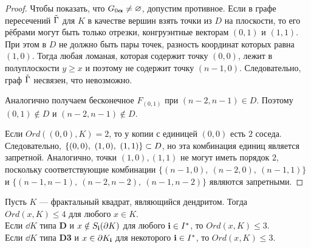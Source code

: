 \begin{proof}
Чтобы показать, что $G_{0{\bm{\alpha}}}\neq\varnothing$, допустим противное.
Если в графе пересечений $\tilde{\Gamma}$ для $K$ в качестве вершин взять точки из $D$ на плоскости, то его рёбрами могут быть только отрезки, конгруэнтные векторам $(0,1)$ и $(1,1)$.
При этом в $D$ не должно быть пары точек, разность координат которых равна $(1,0)$.
Тогда любая ломаная, которая содержит точку $(0,0)$, лежит в полуплоскости $y\ge x$ и поэтому не содержит точку $(n-1,0)$.
Следовательно, граф $\tilde{\Gamma}$ несвязен, что невозможно.

Аналогично получаем бесконечное $F_{(0,1)}$ при $(n-2,n-1)\in D$.
Поэтому $(0,1)\notin D$ и $(n-2,n-1)\notin D$. 
 
Если $Ord((0,0),K)=2$, то у копии с единицей $(0,0)$ есть $2$ соседа. 
Следовательно, $\{(0,0),\ (1,0),\ (1,1)\}\IN D$, но эта комбинация единиц является запретной.
Аналогично, точки $(1,0), (1,1)$ не могут иметь порядок $2$, поскольку соответствующие комбинации $\{(n-1,0),\ (n-2,0),\ (n-1,1)\}$ и $\{(n-1,n-1),\ (n-2,n-2),\ (n-1,n-2)\}$ являются запретными. 
\end{proof} 



\begin{theorem}\label{order}
Пусть $K$ --- фрактальный квадрат, являющийся дендритом. 
Тогда $Ord(x,K)\le 4$ для любого $x\in K$.\\
Если $\dd K$ типа {\bf D} и $x\notin S_{\bf{i}}(\partial K)$ для любого ${\bf{i}}\in I^*$, то $Ord(x,K)\le 3$.\\
Если $\dd K$ типа {\bf D3} и $x\in \partial K_{\bf{i}}$ для некоторого ${\bf{i}}\in I^*$, то $Ord(x, K)\le 3$.
\end{theorem}

